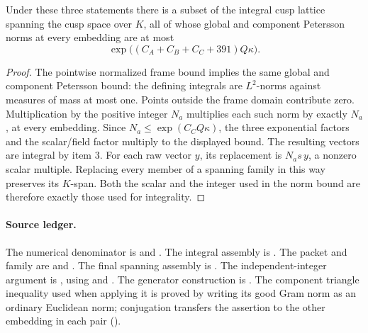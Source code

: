 \begin{srproposition}
\label{prop:ftb-integral-span-assembly}
Under these three statements there is a subset of the integral cusp
lattice spanning the cusp space over \(K\), all of whose global and
component Petersson norms at every embedding are at most
\[
 \exp\bigl((C_A+C_B+C_C+391)Q\kappa\bigr).
\]
\end{srproposition}
\begin{proof}
The pointwise normalized frame bound implies the same global and
component Petersson bound: the defining integrals are \(L^2\)-norms
against measures of mass at most one.  Points outside the frame
domain contribute zero.  Multiplication by the positive integer
\(N_a\) multiplies each such norm by exactly \(N_a\), at every
embedding.  Since \(N_a\le\exp(C_CQ\kappa)\), the three exponential
factors and the scalar/field factor multiply to the displayed bound.
The resulting vectors are integral by item 3.
For each raw vector \(y\), its replacement is \(N_a s\,y\), a nonzero
scalar multiple.  Replacing every member of a spanning family in this
way preserves its \(K\)-span.  Both the scalar and the integer used in
the norm bound are therefore exactly those used for integrality.
\end{proof}

\paragraph{Source ledger.}
The numerical denominator is
and .
The integral assembly is
.
The packet and family are  and .
The final spanning assembly is
.
The independent-integer argument is
,
using
and
.
The generator construction is
.
The component triangle inequality used when applying it is proved by
writing its good Gram norm as an ordinary Euclidean norm; conjugation
transfers the assertion to the other embedding in each pair
().


